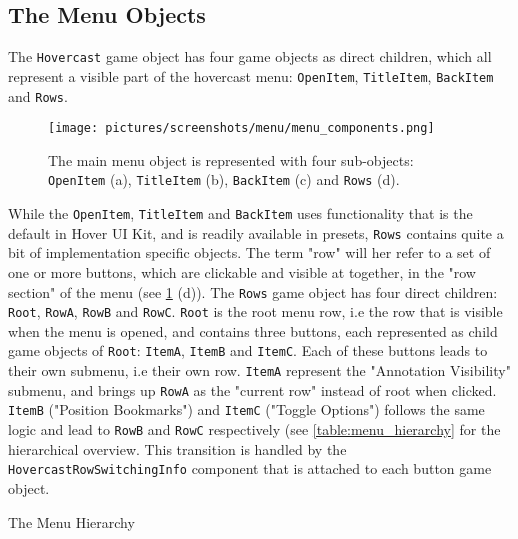 \subsection{The Menu Objects}
The \texttt{Hovercast} game object has four game objects as direct children, which all represent a visible part of the hovercast menu:
\texttt{OpenItem}, \texttt{TitleItem}, \texttt{BackItem} and \texttt{Rows}. 

\begin{figure}%
	\texttt{[image: pictures/screenshots/menu/menu\_components.png]}
	\caption[The Menu components]{The main menu object is represented with four sub-objects: \texttt{OpenItem} (a), \texttt{TitleItem} (b), \texttt{BackItem} (c) 
			 and \texttt{Rows} (d).}
	\label{fig:menu_components}
\end{figure}

While the \texttt{OpenItem}, \texttt{TitleItem} and \texttt{BackItem} uses functionality that is the default in Hover UI Kit, and is readily available in presets,
\texttt{Rows} contains quite a bit of implementation specific objects. The term "row" will her refer to a set of one or more buttons, which are clickable and visible at together,
in the "row section" of the menu (see \ref{fig:menu_components} (d)). The \texttt{Rows} game object has four direct children: \texttt{Root}, \texttt{RowA}, \texttt{RowB} 
and \texttt{RowC}. \texttt{Root} is the root menu row, i.e the row that is visible when the menu is opened, and contains three buttons, each represented as 
child game objects of \texttt{Root}: \texttt{ItemA}, \texttt{ItemB} and \texttt{ItemC}. Each of these buttons leads to their own submenu, i.e their own row. 
\texttt{ItemA} represent the "Annotation Visibility" submenu, and brings up \texttt{RowA} as the "current row" instead of root when clicked. \texttt{ItemB} ("Position Bookmarks") 
and \texttt{ItemC} ("Toggle Options") follows the same logic and lead to \texttt{RowB} and \texttt{RowC} respectively (see \ref{table:menu_hierarchy} for the hierarchical overview. 
This transition is handled by the \texttt{HovercastRowSwitchingInfo} component that is attached to each button game object.  

\renewcommand{\DTstyle}{\textrm\expandafter\raisebox{-0.7ex}}
\DTsetlength{1em}{1em}{0.2em}{0.4pt}{0.4pt}
\setlength{\DTbaselineskip}{2\baselineskip}

\begin{table}[]
\label{table:menu_hierarchy}
\caption[The Menu Hierarchy]{The Menu Hierarchy}
\end{table}

